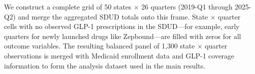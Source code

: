 We construct a complete grid of 50 states $\times$ 26 quarters (2019-Q1 through 2025-Q2) and merge the aggregated SDUD totals onto this frame. State $\times$ quarter cells with no observed GLP-1 prescriptions in the SDUD---for example, early quarters for newly launched drugs like Zepbound---are filled with zeros for all outcome variables. The resulting balanced panel of 1{,}300 state $\times$ quarter observations is merged with Medicaid enrollment data and GLP-1 coverage information to form the analysis dataset used in the main results.
